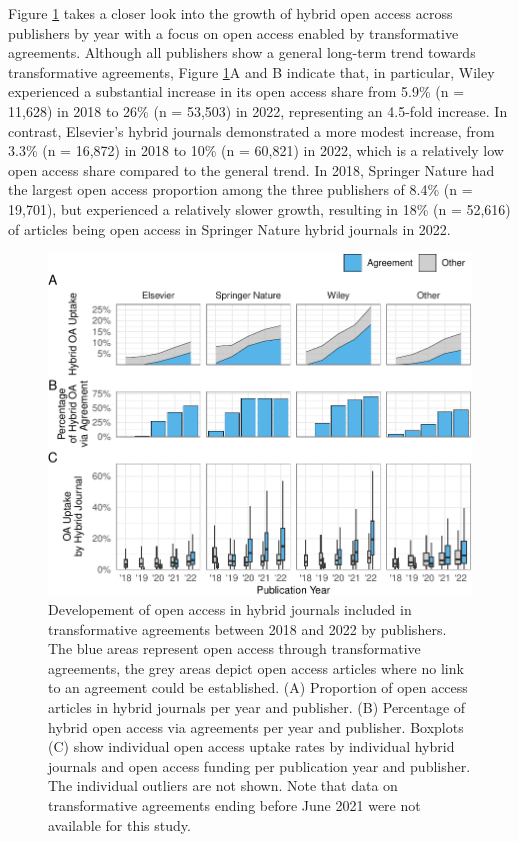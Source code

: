 \documentclass[a4paper,man,floatsintext,longtable,noextraspace,12pt]{apa6}
\begin{document}
Figure \ref{fig:publisher_figure} takes a closer look into the growth of
hybrid open access across publishers by year with a focus on open access
enabled by transformative agreements. Although all publishers show a
general long-term trend towards transformative agreements, Figure
\ref{fig:publisher_figure}A and B indicate that, in particular, Wiley
experienced a substantial increase in its open access share from 5.9\%
(n = 11,628) in 2018 to 26\% (n = 53,503) in 2022, representing an
4.5-fold increase. In contrast, Elsevier's hybrid journals demonstrated
a more modest increase, from 3.3\% (n = 16,872) in 2018 to 10\% (n =
60,821) in 2022, which is a relatively low open access share compared to
the general trend. In 2018, Springer Nature had the largest open access
proportion among the three publishers of 8.4\% (n = 19,701), but
experienced a relatively slower growth, resulting in 18\% (n = 52,616)
of articles being open access in Springer Nature hybrid journals in
2022.

\begin{figure}[ht!]

{\centering \includegraphics[width=0.99\linewidth,]{fig/publisher_figure-1} 

}

\caption{Developement of open access in hybrid journals included in transformative agreements between 2018 and 2022 by publishers. The blue areas represent open access through transformative agreements, the grey areas depict open access articles where no link to an agreement could be established. (A) Proportion of open access articles in hybrid journals per year and publisher. (B) Percentage of hybrid open access via agreements per year and publisher. Boxplots (C) show individual open access uptake rates by individual hybrid journals and open access funding per publication year and publisher. The individual outliers are not shown. Note that data on transformative agreements ending before June 2021 were not available for this study.}\label{fig:publisher_figure}
\end{figure}
\end{document}
